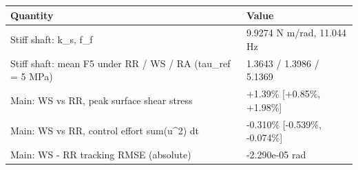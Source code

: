 \begin{tabular}{@{}ll@{}}
\toprule
Quantity & Value \\
\midrule
Stiff shaft: k\_s, f\_f & 9.9274 N m/rad, 11.044 Hz \\
Stiff shaft: mean F5 under RR / WS / RA (tau\_ref = 5 MPa) & 1.3643 / 1.3986 / 5.1369 \\
Main: WS vs RR, peak surface shear stress & +1.39\% [+0.85\%, +1.98\%] \\
Main: WS vs RR, control effort sum(u^2) dt & -0.310\% [-0.539\%, -0.074\%] \\
Main: WS - RR tracking RMSE (absolute) & -2.290e-05 rad \\
\bottomrule
\end{tabular}
